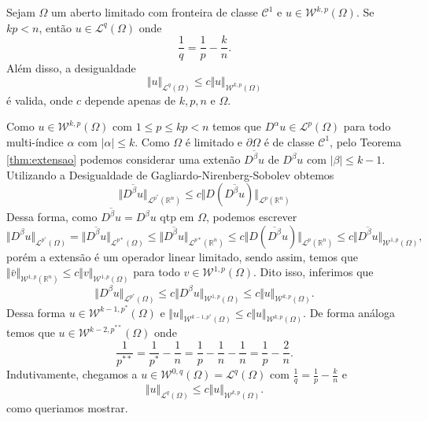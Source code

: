 \documentclass[a4paper, 11pt]{book}
\theoremstyle{definition}
\newcommand{\bR}{\mathbb{R}}
\newcommand{\cC}{\mathcal{C}}
\newcommand{\cL}{\mathcal{L}}
\newcommand{\cW}{\mathcal{W}}
\begin{document}
\begin{tbox}
    Sejam $\Omega$ um aberto limitado com fronteira de classe $\cC^1$ e $u \in \cW^{k,p}(\Omega)$.
    Se $kp < n$, então $u \in \cL^q(\Omega)$ onde
    \[
        \frac{1}{q} = \frac{1}{p} - \frac{k}{n}.
    \]
    Além disso, a desigualdade
    \[
        \Vert u \Vert_{\cL^q(\Omega)} \leqslant c \Vert u \Vert_{\cW^{k,p}(\Omega)}
    \]
    é valida, onde $c$ depende apenas de $k, p, n$ e $\Omega$.
\end{tbox}
\begin{prf}
    Como $u \in \cW^{k,p}(\Omega)$ com $1 \leqslant p \leqslant kp < n$ temos que $D^\alpha u \in \cL^p(\Omega)$ para todo multi-índice $\alpha$ com $|\alpha| \leqslant k$. 
    Como $\Omega$ é limitado e $\partial\Omega$ é de classe $\cC^1$, pelo Teorema \ref{thm:extensao} podemos considerar uma extenão $\overline{D^\beta u}$ de $D^\beta u$ com $|\beta| \leqslant k -1$. 
    Utilizando a Desigualdade de Gagliardo-Nirenberg-Sobolev obtemos
    \[
        \Vert \overline{D^\beta u} \Vert_{\cL^{p^*}(\bR^n)} \leqslant c \Vert D (\overline{D^\beta u}) \Vert_{\cL^p(\bR^ n)}
    \]
    Dessa forma, como $\overline{D^\beta u} = D^\beta u$ qtp em $\Omega$, podemos escrever
    \[
        \Vert D^\beta u \Vert_{\cL^{p^*}(\Omega)} = \Vert \overline{D^\beta u} \Vert_{\cL^{p*}(\Omega)} \leqslant \Vert \overline{D^\beta u} \Vert_{\cL^{p*}(\bR^n)} \leqslant c \Vert D (\overline{D^\beta}u) \Vert_{\cL^p(\bR^ n)} \leqslant c \Vert \overline{D^\beta u} \Vert_{\cW^{1,p}(\Omega)},
    \]
    porém a extensão é um operador linear limitado, sendo assim, temos que $\Vert \bar v \Vert_{\cW^{1,p}(\bR^n)} \leqslant c \Vert v \Vert_{\cW^{1,p}(\Omega)}$ para todo $v \in \cW^{1,p}(\Omega)$. Dito isso, inferimos que
    \[
        \Vert D^\beta u \Vert_{\cL^{p^*}(\Omega)} \leqslant c \Vert D^\beta u \Vert_{\cW^{1,p}(\Omega)} \leqslant c \Vert u \Vert_{\cW^{k,p}(\Omega)}.
    \]
    Dessa forma $u \in \cW^{k-1,p^*}(\Omega)$ e $\Vert u \Vert_{\cW^{k-1,p^*}(\Omega)} \leqslant c \Vert u \Vert_{\cW^{k,p}(\Omega)}$.
    De forma análoga temos que $u \in \cW^{k-2,p^{**}}(\Omega)$ onde
    \[
        \frac{1}{p^{**}} = \frac{1}{p^*} - \frac{1}{n} = \frac{1}{p} - \frac{1}{n} - \frac{1}{n} = \frac{1}{p} - \frac{2}{n}.
    \]
    Indutivamente, chegamos a $u \in \cW^{0,q}(\Omega) = \cL^q(\Omega)$ com $\frac{1}{q} = \frac{1}{p} - \frac{k}{n}$ e
    \[
        \Vert u \Vert_{\cL^q(\Omega)} \leqslant c \Vert u \Vert_{\cW^{k,p}(\Omega)}.
    \]
    como queriamos mostrar.
\end{prf}
\end{document}
